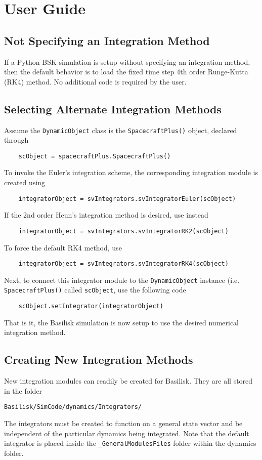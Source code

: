 
\section{User Guide}

\subsection{Not Specifying an Integration Method}
If a Python BSK simulation is setup without specifying an integration method, then the default behavior is to load the fixed time step 4th order Runge-Kutta (RK4) method.  No additional code is required by the user.


\subsection{Selecting Alternate Integration Methods}
Assume the {\tt DynamicObject} class is the {\tt SpacecraftPlus()} object, declared through
\begin{verbatim}
	scObject = spacecraftPlus.SpacecraftPlus()
\end{verbatim}
To invoke the Euler's  integration scheme, the corresponding integration module is created using
\begin{verbatim}
	integratorObject = svIntegrators.svIntegratorEuler(scObject)
\end{verbatim}
If the 2nd order Heun's integration method is desired, use instead
\begin{verbatim}
	integratorObject = svIntegrators.svIntegratorRK2(scObject)
\end{verbatim}
To force the default RK4 method, use
\begin{verbatim}
	integratorObject = svIntegrators.svIntegratorRK4(scObject)
\end{verbatim}

Next, to connect this integrator module to the {\tt DynamicObject} instance (i.e. {\tt SpacecraftPlus()} called {\tt scObject}, use the following code
\begin{verbatim}
	scObject.setIntegrator(integratorObject)
\end{verbatim}
That is it, the Basilisk simulation is now setup to use the desired numerical  integration method.


\subsection{Creating New Integration Methods}
New integration modules can readily be created for Basilisk. They are all stored in the folder
\begin{verbatim}
Basilisk/SimCode/dynamics/Integrators/
\end{verbatim}
The integrators must be created to function on a general state vector and be independent of the particular dynamics being integrated. Note that the default integrator is placed inside the {\tt\_GeneralModulesFiles} folder within the dynamics folder.